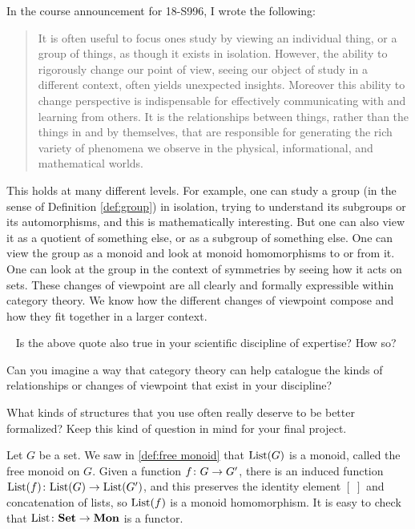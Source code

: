 \begin{remark}

In the course announcement for 18-S996, I wrote the following:
\begin{quote}
It is often useful to focus ones study by viewing an individual thing, or a group of things, as though it exists in isolation. However, the ability to rigorously change our point of view, seeing our object of study in a different context, often yields unexpected insights. Moreover this ability to change perspective is indispensable for effectively communicating with and learning from others. It is the relationships between things, rather than the things in and by themselves, that are responsible for generating the rich variety of phenomena we observe in the physical, informational, and mathematical worlds.
\end{quote}
This holds at many different levels. For example, one can study a group (in the sense of Definition \ref{def:group}) in isolation, trying to understand its subgroups or its automorphisms, and this is mathematically interesting. But one can also view it as a quotient of something else, or as a subgroup of something else. One can view the group as a monoid and look at monoid homomorphisms to or from it. One can look at the group in the context of symmetries by seeing how it acts on sets. These changes of viewpoint are all clearly and formally expressible within category theory. We know how the different changes of viewpoint compose and how they fit together in a larger context. 

\end{remark}

\begin{exercise}~
\sexc Is the above quote also true in your scientific discipline of expertise? How so? 
\item Can you imagine a way that category theory can help catalogue the kinds of relationships or changes of viewpoint that exist in your discipline? 
\item What kinds of structures that you use often really deserve to be better formalized?
\endsexc
Keep this kind of question in mind for your final project.
\end{exercise}

\begin{example}\label{ex:free monoid}

Let $G$ be a set. We saw in \ref{def:free monoid} that $\textnormal{List}(G)$ is a monoid, called the free monoid on $G$. Given a function $f\colon G\rightarrow G'$, there is an induced function $\textnormal{List}(f)\colon\textnormal{List}(G)\rightarrow\textnormal{List}(G')$, and this preserves the identity element $[\;]$ and concatenation of lists, so $\textnormal{List}(f)$ is a monoid homomorphism. It is easy to check that $\textnormal{List}\colon{\bf Set}\rightarrow{\bf Mon}$ is a functor.

\end{example}

